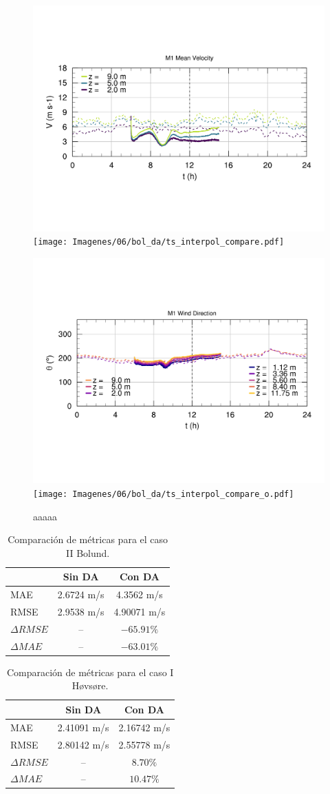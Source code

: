 \begin{figure}[H]
	\centering
	\includegraphics[width=0.5\linewidth,trim={7mm 68mm 10mm 55mm},clip]{Imagenes/06/bol/ts_interpol_compare.pdf}%
	\texttt{[image: Imagenes/06/bol\_da/ts\_interpol\_compare.pdf]}%
	
	\includegraphics[width=0.5\linewidth,trim={12mm 48mm 10mm 55mm},clip]{Imagenes/06/bol/ts_interpol_compare_o.pdf}%
	\texttt{[image: Imagenes/06/bol\_da/ts\_interpol\_compare\_o.pdf]}%
	\caption{aaaaa}
	\label{fig:06_bol_ts_m4}
\end{figure}


\begin{table}[h!]
	\caption{Comparación de métricas para el caso II Bolund.}
	\label{tab:06_bol_mae_rmse}
	\centering%
	\begin{tabular}{lcc}
		\toprule
		& Sin DA & Con DA \\
		\midrule
		MAE & 2.6724 m/s & 4.3562 m/s \\
		RMSE & 2.9538 m/s& 4.90071 m/s\\
		$\Delta{RMSE}$&  -- & $-65.91\%$ \\
		$\Delta{MAE}$ &  -- & $-63.01\%$ \\
		\bottomrule
	\end{tabular}
\end{table}
\begin{table}[H]
	\caption{Comparación de métricas para el caso I Høvsøre.}
	\label{tab:06_hov_mae_rmse}
	\centering%
	\begin{tabular}{lcc}
		\toprule
		& Sin DA & Con DA \\
		\midrule
		MAE & 2.41091 m/s & 2.16742 m/s \\
		RMSE & 2.80142 m/s& 2.55778 m/s\\
		$\Delta{RMSE}$& --  & $8.70\%$  \\
		$\Delta{MAE}$ & -- & $10.47\%$  \\
		\bottomrule
	\end{tabular}
\end{table}